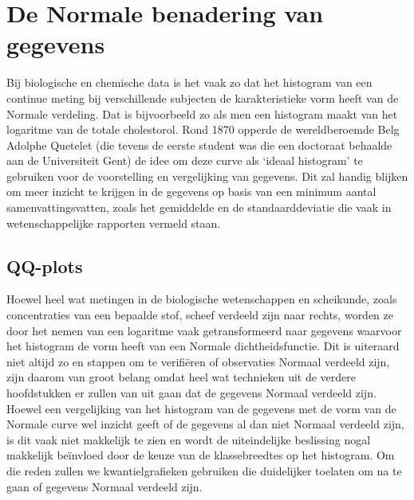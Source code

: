 \documentclass[
  dutch,
  letterpaper,
  12pt]{book}
\theoremstyle{definition}
\theoremstyle{definition}
\theoremstyle{definition}
\theoremstyle{remark}
\begin{document}
\section{De Normale benadering van gegevens}\label{sec-normal}

Bij biologische en chemische data is het vaak zo dat het histogram van
een continue meting bij verschillende subjecten de karakteristieke vorm
heeft van de Normale verdeling. Dat is bijvoorbeeld zo als men een
histogram maakt van het logaritme van de totale cholestorol. Rond 1870
opperde de wereldberoemde Belg Adolphe Quetelet (die tevens de eerste
student was die een doctoraat behaalde aan de Universiteit Gent) de idee
om deze curve als `ideaal histogram' te gebruiken voor de voorstelling
en vergelijking van gegevens. Dit zal handig blijken om meer inzicht te
krijgen in de gegevens op basis van een minimum aantal
samenvattingsvatten, zoals het gemiddelde en de standaarddeviatie die
vaak in wetenschappelijke rapporten vermeld staan.

\subsection{QQ-plots}\label{sec-qq}

Hoewel heel wat metingen in de biologische wetenschappen en scheikunde,
zoals concentraties van een bepaalde stof, scheef verdeeld zijn naar
rechts, worden ze door het nemen van een logaritme vaak getransformeerd
naar gegevens waarvoor het histogram de vorm heeft van een Normale
dichtheidsfunctie. Dit is uiteraard niet altijd zo en stappen om te
verifiëren of observaties Normaal verdeeld zijn, zijn daarom van groot
belang omdat heel wat technieken uit de verdere hoofdstukken er zullen
van uit gaan dat de gegevens Normaal verdeeld zijn. Hoewel een
vergelijking van het histogram van de gegevens met de vorm van de
Normale curve wel inzicht geeft of de gegevens al dan niet Normaal
verdeeld zijn, is dit vaak niet makkelijk te zien en wordt de
uiteindelijke beslissing nogal makkelijk beïnvloed door de keuze van de
klassebreedtes op het histogram. Om die reden zullen we
kwantielgrafieken gebruiken die duidelijker toelaten om na te gaan of
gegevens Normaal verdeeld zijn.
\end{document}

